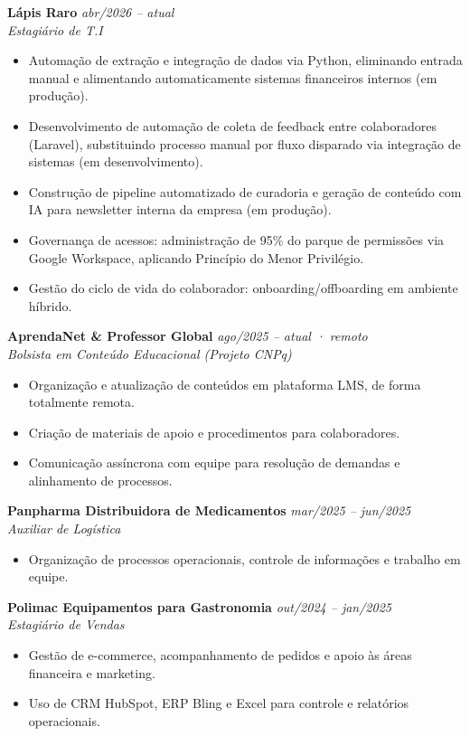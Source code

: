 \documentclass[11pt,a4paper]{article}
\begin{document}
\textbf{Lápis Raro} \hfill \textit{abr/2026 -- atual}\\
\textit{Estagiário de T.I}
\begin{itemize}
  \item Automação de extração e integração de dados via Python, eliminando entrada manual e
        alimentando automaticamente sistemas financeiros internos (em produção).
  \item Desenvolvimento de automação de coleta de feedback entre colaboradores (Laravel),
        substituindo processo manual por fluxo disparado via integração de sistemas (em desenvolvimento).
  \item Construção de pipeline automatizado de curadoria e geração de conteúdo com IA para
        newsletter interna da empresa (em produção).
  \item Governança de acessos: administração de 95\% do parque de permissões via Google Workspace,
        aplicando Princípio do Menor Privilégio.
  \item Gestão do ciclo de vida do colaborador: onboarding/offboarding em ambiente híbrido.
\end{itemize}

\medskip

\textbf{AprendaNet \& Professor Global} \hfill \textit{ago/2025 -- atual · remoto}\\
\textit{Bolsista em Conteúdo Educacional (Projeto CNPq)}
\begin{itemize}
  \item Organização e atualização de conteúdos em plataforma LMS, de forma totalmente remota.
  \item Criação de materiais de apoio e procedimentos para colaboradores.
  \item Comunicação assíncrona com equipe para resolução de demandas e alinhamento de processos.
\end{itemize}

\medskip

\textbf{Panpharma Distribuidora de Medicamentos} \hfill \textit{mar/2025 -- jun/2025}\\
\textit{Auxiliar de Logística}
\begin{itemize}
  \item Organização de processos operacionais, controle de informações e trabalho em equipe.
\end{itemize}

\medskip

\textbf{Polimac Equipamentos para Gastronomia} \hfill \textit{out/2024 -- jan/2025}\\
\textit{Estagiário de Vendas}
\begin{itemize}
  \item Gestão de e-commerce, acompanhamento de pedidos e apoio às áreas financeira e marketing.
  \item Uso de CRM HubSpot, ERP Bling e Excel para controle e relatórios operacionais.
\end{itemize}
\end{document}
